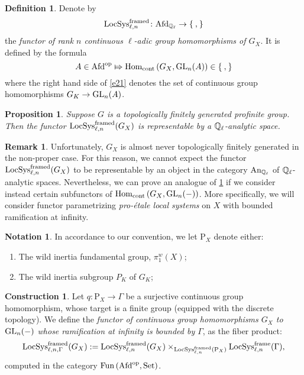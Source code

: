 \documentclass[10pt,a4paper]{amsart}
\numberwithin{equation}{subsection}
\theoremstyle{plain}
\newtheorem{prop}[theorem]{Proposition}
\theoremstyle{definition}
\newtheorem{defi}[theorem]{Definition}
\newtheorem{notation}[theorem]{Notation}
\newtheorem{rema}[theorem]{Remark}
\newtheorem{construction}[theorem]{Construction}
\theoremstyle{remark}
\numberwithin{equation}{section}
\begin{document}
\begin{defi}
Denote by
	\[
		\mathrm{LocSys}_{\ell, n}^{\mathrm{framed}} \colon \mathrm{Afd}_{\mathbb{Q}_\ell} \to  \Set,
	\]
the \emph{functor of rank $n$ continuous $\ell$-adic group homomorphisms of $G_X$}. It is defined by the formula
	\begin{equation} \label{e21}
		A \in \mathrm{Afd}^{\mathrm{op}} \Mapsto \mathrm{Hom}_{\mathrm{cont}} \left( G_X, \mathrm{GL}_n( A) \right) \in \Set,
	\end{equation}
where the right hand side of \eqref{e21} denotes the set of continuous group homomorphisms $G_K \to \mathrm{GL}_n(A)$.
\end{defi}

\begin{prop}{\cite[Corollary 2.2.16]{me1}} \label{me1}
Suppose $G$ is a topologically finitely generated profinite group. Then the functor $\mathrm{LocSys}_{\ell, n}^{\mathrm{framed}}(G_X)$
is representable by a $\mathbb{Q}_{\ell}$-analytic space. 
\end{prop}

\begin{rema}
Unfortunately, $G_X$ is almost never topologically finitely generated in the non-proper case. For this reason, we cannot expect the functor $\mathrm{LocSys}_{\ell, n}^{\mathrm{framed}}(G_X) $ to be representable by an object in the category $\mathrm{An}_{\mathbb{Q}_\ell}$ of $\mathbb{Q}_\ell$-analytic spaces.
Nevertheless,
we can prove an analogue of \cref{me1} if we consider instead certain subfunctors of $\mathrm{Hom}_{\mathrm{cont}} \left( G_X, \mathrm{GL}_n( - ) \right)$. More specifically, we will consider functor parametrizing \emph{pro-\'etale local systems} on $X$ with bounded
ramification at infinity.
\end{rema}

\begin{notation}
In accordance to our convention, we let $\mathrm P_X$ denote either:
\begin{enumerate}
\item The wild inertia fundamental group, $\pi_1^w(X)$;
\item The wild inertia subgroup $P_K$ of $G_K$;
\end{enumerate}
\end{notation}

\begin{construction} \label{const1}
Let $q \colon \mathrm P_X \to \Gamma$ be a surjective continuous group homomorphism, whose target is a finite group (equipped with the discrete topology). We define the \emph{functor of continuous group homomorphisms $G_X$ to $\mathrm{GL}_n(-)$
whose ramification at infinity
is bounded by $\Gamma$}, as the fiber product:
	\begin{equation} \label{eq_def}
		\mathrm{LocSys}_{\ell, n, \Gamma}^{\mathrm{framed}}(G_X): =  \mathrm{LocSys}_{\ell, n}^{\mathrm{framed}}(G_X)\times_{  		\mathrm{LocSys}_{\ell, n}^{\mathrm{framed}}(\mathrm P_X)	}	\mathrm{LocSys}_{\ell, n}^{\mathrm{frame}}(\Gamma),
	\end{equation}
computed in the category $\mathrm{Fun} \left( \mathrm{Afd}^{\mathrm{op}}, \mathrm{Set} \right)$.
\end{construction}
\end{document}

